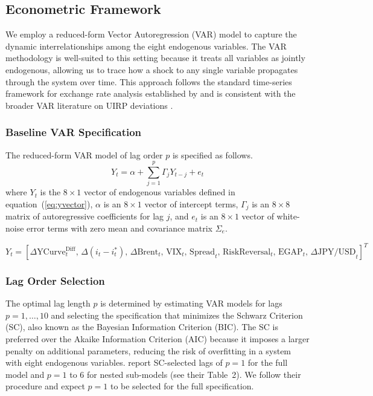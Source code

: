 \documentclass[12pt]{article}
\begin{document}
\subsection{Econometric Framework}

{} We employ a reduced-form Vector Autoregression (VAR) model to capture the dynamic interrelationships among the eight endogenous variables. The VAR methodology is well-suited to this setting because it treats all variables as jointly endogenous, allowing us to trace how a shock to any single variable propagates through the system over time. This approach follows the standard time-series framework for exchange rate analysis established by \textcite{guyot2026risk} and is consistent with the broader VAR literature on UIRP deviations \parencite{engel2016exchange, eichenbaum1995some}.

\subsubsection{Baseline VAR Specification}

{} The reduced-form VAR model of lag order $p$ is specified as follows.
\begin{equation}
Y_t = \alpha + \sum_{j=1}^{p} \Gamma_j Y_{t-j} + e_t \label{eq:var}
\end{equation}
where $Y_t$ is the $8 \times 1$ vector of endogenous variables defined in equation~(\ref{eq:yvector}), $\alpha$ is an $8 \times 1$ vector of intercept terms, $\Gamma_j$ is an $8 \times 8$ matrix of autoregressive coefficients for lag $j$, and $e_t$ is an $8 \times 1$ vector of white-noise error terms with zero mean and covariance matrix $\Sigma_e$.

\begin{equation}
Y_t = \left[ \Delta\text{YCurve}^{\text{Diff}}_t, \, \Delta(i_t - i_t^*), \, \Delta\text{Brent}_t, \, \text{VIX}_t, \, \text{Spread}_t, \, \text{RiskReversal}_t, \, \text{EGAP}_t, \, \Delta\text{JPY/USD}_t \right]^T
\label{eq:yvector}
\end{equation}

\subsubsection{Lag Order Selection}

{} The optimal lag length $p$ is determined by estimating VAR models for lags $p = 1, \ldots, 10$ and selecting the specification that minimizes the Schwarz Criterion (SC), also known as the Bayesian Information Criterion (BIC). The SC is preferred over the Akaike Information Criterion (AIC) because it imposes a larger penalty on additional parameters, reducing the risk of overfitting in a system with eight endogenous variables. \textcite{guyot2026risk} report SC-selected lags of $p = 1$ for the full model and $p = 1$ to $6$ for nested sub-models (see their Table~2). We follow their procedure and expect $p = 1$ to be selected for the full specification.
\end{document}
